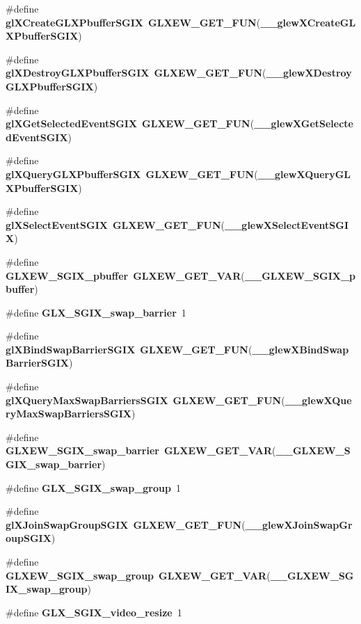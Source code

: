 \begin{DoxyCompactItemize}
\#define {\bf gl\+X\+Create\+G\+L\+X\+Pbuffer\+S\+G\+IX}~{\bf G\+L\+X\+E\+W\+\_\+\+G\+E\+T\+\_\+\+F\+UN}({\bf \+\_\+\+\_\+glew\+X\+Create\+G\+L\+X\+Pbuffer\+S\+G\+IX})
\item 
\#define {\bf gl\+X\+Destroy\+G\+L\+X\+Pbuffer\+S\+G\+IX}~{\bf G\+L\+X\+E\+W\+\_\+\+G\+E\+T\+\_\+\+F\+UN}({\bf \+\_\+\+\_\+glew\+X\+Destroy\+G\+L\+X\+Pbuffer\+S\+G\+IX})
\item 
\#define {\bf gl\+X\+Get\+Selected\+Event\+S\+G\+IX}~{\bf G\+L\+X\+E\+W\+\_\+\+G\+E\+T\+\_\+\+F\+UN}({\bf \+\_\+\+\_\+glew\+X\+Get\+Selected\+Event\+S\+G\+IX})
\item 
\#define {\bf gl\+X\+Query\+G\+L\+X\+Pbuffer\+S\+G\+IX}~{\bf G\+L\+X\+E\+W\+\_\+\+G\+E\+T\+\_\+\+F\+UN}({\bf \+\_\+\+\_\+glew\+X\+Query\+G\+L\+X\+Pbuffer\+S\+G\+IX})
\item 
\#define {\bf gl\+X\+Select\+Event\+S\+G\+IX}~{\bf G\+L\+X\+E\+W\+\_\+\+G\+E\+T\+\_\+\+F\+UN}({\bf \+\_\+\+\_\+glew\+X\+Select\+Event\+S\+G\+IX})
\item 
\#define {\bf G\+L\+X\+E\+W\+\_\+\+S\+G\+I\+X\+\_\+pbuffer}~{\bf G\+L\+X\+E\+W\+\_\+\+G\+E\+T\+\_\+\+V\+AR}({\bf \+\_\+\+\_\+\+G\+L\+X\+E\+W\+\_\+\+S\+G\+I\+X\+\_\+pbuffer})
\item 
\#define {\bf G\+L\+X\+\_\+\+S\+G\+I\+X\+\_\+swap\+\_\+barrier}~1
\item 
\#define {\bf gl\+X\+Bind\+Swap\+Barrier\+S\+G\+IX}~{\bf G\+L\+X\+E\+W\+\_\+\+G\+E\+T\+\_\+\+F\+UN}({\bf \+\_\+\+\_\+glew\+X\+Bind\+Swap\+Barrier\+S\+G\+IX})
\item 
\#define {\bf gl\+X\+Query\+Max\+Swap\+Barriers\+S\+G\+IX}~{\bf G\+L\+X\+E\+W\+\_\+\+G\+E\+T\+\_\+\+F\+UN}({\bf \+\_\+\+\_\+glew\+X\+Query\+Max\+Swap\+Barriers\+S\+G\+IX})
\item 
\#define {\bf G\+L\+X\+E\+W\+\_\+\+S\+G\+I\+X\+\_\+swap\+\_\+barrier}~{\bf G\+L\+X\+E\+W\+\_\+\+G\+E\+T\+\_\+\+V\+AR}({\bf \+\_\+\+\_\+\+G\+L\+X\+E\+W\+\_\+\+S\+G\+I\+X\+\_\+swap\+\_\+barrier})
\item 
\#define {\bf G\+L\+X\+\_\+\+S\+G\+I\+X\+\_\+swap\+\_\+group}~1
\item 
\#define {\bf gl\+X\+Join\+Swap\+Group\+S\+G\+IX}~{\bf G\+L\+X\+E\+W\+\_\+\+G\+E\+T\+\_\+\+F\+UN}({\bf \+\_\+\+\_\+glew\+X\+Join\+Swap\+Group\+S\+G\+IX})
\item 
\#define {\bf G\+L\+X\+E\+W\+\_\+\+S\+G\+I\+X\+\_\+swap\+\_\+group}~{\bf G\+L\+X\+E\+W\+\_\+\+G\+E\+T\+\_\+\+V\+AR}({\bf \+\_\+\+\_\+\+G\+L\+X\+E\+W\+\_\+\+S\+G\+I\+X\+\_\+swap\+\_\+group})
\item 
\#define {\bf G\+L\+X\+\_\+\+S\+G\+I\+X\+\_\+video\+\_\+resize}~1

\end{DoxyCompactItemize}
